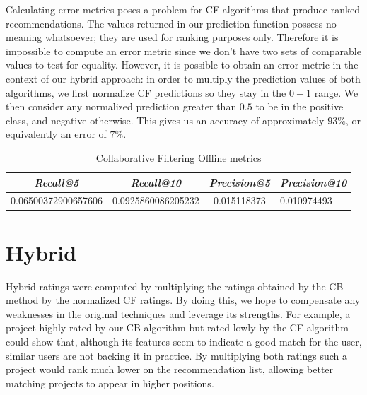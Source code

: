 \documentclass[cic,tc,english]{iiufrgs}
\begin{document}
Calculating error metrics poses a problem for CF algorithms that produce ranked recommendations. The values returned in our prediction function possess no meaning whatsoever; they are used for ranking purposes only. Therefore it is impossible to compute an error metric since we don't have two sets of comparable values to test for equality. However, it is possible to obtain an error metric in the context of our hybrid approach: in order to multiply the prediction values of both algorithms, we first normalize CF predictions so they stay in the $0-1$ range. We then consider any normalized prediction greater than $0.5$ to be in the positive class, and negative otherwise. This gives us an accuracy of approximately $93\%$, or equivalently an error of $7\%$.


\begin{table}[h]
    \caption{Collaborative Filtering Offline metrics}
    \centering
        \begin{tabular}{c|c|c|p{5cm}}
          \hline
          \textit{Recall@5}  &   \textit{Recall@10}  &   \textit{Precision@5} &   \textit{Precision@10} \\
          \hline
          \hline
          0.06500372900657606           & 0.0925860086205232 &  0.015118373  & 0.010974493  \\
          \hline
        \end{tabular}
    \label{tbl:cb_offline_metrics}
\end{table}

\section{Hybrid}
Hybrid ratings were computed by multiplying the ratings obtained by the CB method by the normalized CF ratings. By doing this, we hope to compensate any weaknesses in the original techniques and leverage its strengths. For example, a project highly rated by our CB algorithm but rated lowly by the CF algorithm could show that, although its features seem to indicate a good match for the user, similar users are not backing it in practice. By multiplying both ratings such a project would rank much lower on the recommendation list, allowing better matching projects to appear in higher positions.
\end{document}
